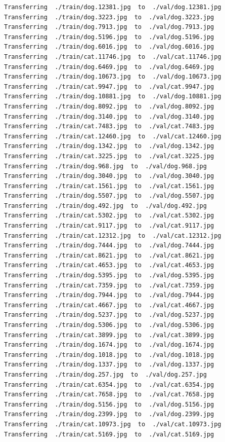 \documentclass[]{book}
\theoremstyle{definition}
\theoremstyle{definition}
\theoremstyle{definition}
\theoremstyle{remark}
\begin{document}
\begin{verbatim}
Transferring  ./train/dog.12381.jpg  to  ./val/dog.12381.jpg
Transferring  ./train/dog.3223.jpg  to  ./val/dog.3223.jpg
Transferring  ./train/dog.7913.jpg  to  ./val/dog.7913.jpg
Transferring  ./train/dog.5196.jpg  to  ./val/dog.5196.jpg
Transferring  ./train/dog.6016.jpg  to  ./val/dog.6016.jpg
Transferring  ./train/cat.11746.jpg  to  ./val/cat.11746.jpg
Transferring  ./train/dog.6469.jpg  to  ./val/dog.6469.jpg
Transferring  ./train/dog.10673.jpg  to  ./val/dog.10673.jpg
Transferring  ./train/cat.9947.jpg  to  ./val/cat.9947.jpg
Transferring  ./train/dog.10881.jpg  to  ./val/dog.10881.jpg
Transferring  ./train/dog.8092.jpg  to  ./val/dog.8092.jpg
Transferring  ./train/dog.3140.jpg  to  ./val/dog.3140.jpg
Transferring  ./train/cat.7483.jpg  to  ./val/cat.7483.jpg
Transferring  ./train/cat.12460.jpg  to  ./val/cat.12460.jpg
Transferring  ./train/dog.1342.jpg  to  ./val/dog.1342.jpg
Transferring  ./train/cat.3225.jpg  to  ./val/cat.3225.jpg
Transferring  ./train/dog.968.jpg  to  ./val/dog.968.jpg
Transferring  ./train/dog.3040.jpg  to  ./val/dog.3040.jpg
Transferring  ./train/cat.1561.jpg  to  ./val/cat.1561.jpg
Transferring  ./train/dog.5507.jpg  to  ./val/dog.5507.jpg
Transferring  ./train/dog.492.jpg  to  ./val/dog.492.jpg
Transferring  ./train/cat.5302.jpg  to  ./val/cat.5302.jpg
Transferring  ./train/cat.9117.jpg  to  ./val/cat.9117.jpg
Transferring  ./train/cat.12312.jpg  to  ./val/cat.12312.jpg
Transferring  ./train/dog.7444.jpg  to  ./val/dog.7444.jpg
Transferring  ./train/cat.8621.jpg  to  ./val/cat.8621.jpg
Transferring  ./train/cat.4653.jpg  to  ./val/cat.4653.jpg
Transferring  ./train/dog.5395.jpg  to  ./val/dog.5395.jpg
Transferring  ./train/cat.7359.jpg  to  ./val/cat.7359.jpg
Transferring  ./train/dog.7944.jpg  to  ./val/dog.7944.jpg
Transferring  ./train/cat.4667.jpg  to  ./val/cat.4667.jpg
Transferring  ./train/dog.5237.jpg  to  ./val/dog.5237.jpg
Transferring  ./train/dog.5306.jpg  to  ./val/dog.5306.jpg
Transferring  ./train/cat.3899.jpg  to  ./val/cat.3899.jpg
Transferring  ./train/dog.1674.jpg  to  ./val/dog.1674.jpg
Transferring  ./train/dog.1018.jpg  to  ./val/dog.1018.jpg
Transferring  ./train/dog.1337.jpg  to  ./val/dog.1337.jpg
Transferring  ./train/dog.257.jpg  to  ./val/dog.257.jpg
Transferring  ./train/cat.6354.jpg  to  ./val/cat.6354.jpg
Transferring  ./train/cat.7658.jpg  to  ./val/cat.7658.jpg
Transferring  ./train/dog.5156.jpg  to  ./val/dog.5156.jpg
Transferring  ./train/dog.2399.jpg  to  ./val/dog.2399.jpg
Transferring  ./train/cat.10973.jpg  to  ./val/cat.10973.jpg
Transferring  ./train/cat.5169.jpg  to  ./val/cat.5169.jpg

\end{verbatim}
\end{document}
